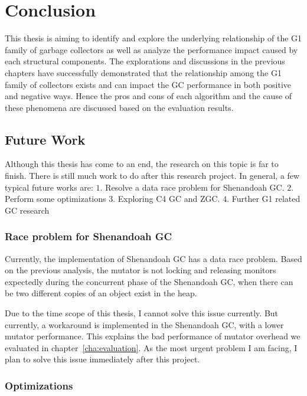 \chapter{Conclusion}
\label{cha:conc}

This thesis is aiming to identify and explore the underlying relationship of the
G1 family of garbage collectors as well as analyze the performance impact caused by
each structural components.
The explorations and discussions in the previous chapters have successfully demonstrated
that the relationship among the G1 family of collectors exists and can impact the GC
performance in both positive and negative ways.
Hence the pros and cons of each algorithm and the cause of these phenomena
are discussed based on the evaluation results.

\section{Future Work}
\label{sec:future}

Although this thesis has come to an end, the research on this topic is far to finish.
There is still much work to do after this research project.
In general, a few typical future works are:
$1.$ Resolve a data race problem for Shenandoah GC.
$2.$ Perform some optimizations
$3.$ Exploring C4 GC and ZGC.
$4.$ Further G1 related GC research

\subsection{Race problem for Shenandoah GC}

Currently, the implementation of Shenandoah GC has a data race problem.
Based on the previous analysis, the mutator is not locking and releasing monitors
expectedly during the concurrent phase of the Shenandoah GC, when there can be
two different copies of an object exist in the heap.

Due to the time scope of this thesis, I cannot solve this issue currently.
But currently, a workaround is implemented in the Shenandoah GC, with a lower mutator performance.
This explains the bad performance of mutator overhead we evaluated in chapter~\ref{cha:evaluation}.
As the most urgent problem I am facing, I plan to solve this issue immediately after
this project.

\subsection{Optimizations}

